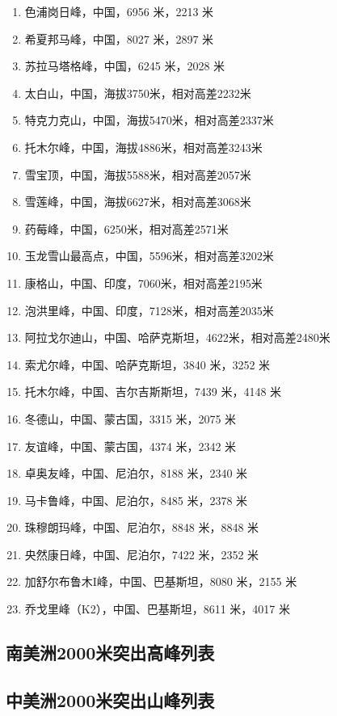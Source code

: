 \documentclass[10pt,twocolumn,letterpaper]{article}
\begin{document}
\begin{flushleft}
\begin{enumerate}
    \item 色浦岗日峰，中国，6956 米，2213 米
    \item 希夏邦马峰，中国，8027 米，2897 米
    \item 苏拉马塔格峰，中国，6245 米，2028 米
    \item 太白山，中国，海拔3750米，相对高差2232米
    \item 特克力克山，中国，海拔5470米，相对高差2337米
    \item 托木尔峰，中国，海拔4886米，相对高差3243米
    \item 雪宝顶，中国，海拔5588米，相对高差2057米
    \item 雪莲峰，中国，海拔6627米，相对高差3068米
    \item 药莓峰，中国，6250米，相对高差2571米
    \item 玉龙雪山最高点，中国，5596米，相对高差3202米
    \item 康格山，中国、印度，7060米，相对高差2195米
    \item 泡洪里峰，中国、印度，7128米，相对高差2035米
    \item 阿拉戈尔迪山，中国、哈萨克斯坦，4622米，相对高差2480米
    \item 索尤尔峰，中国、哈萨克斯坦，3840 米，3252 米
    \item 托木尔峰，中国、吉尔吉斯斯坦，7439 米，4148 米
    \item 冬德山，中国、蒙古国，3315 米，2075 米
    \item 友谊峰，中国、蒙古国，4374 米，2342 米
    \item 卓奥友峰，中国、尼泊尔，8188 米，2340 米
    \item 马卡鲁峰，中国、尼泊尔，8485 米，2378 米
    \item 珠穆朗玛峰，中国、尼泊尔，8848 米，8848 米
    \item 央然康日峰，中国、尼泊尔，7422 米，2352 米
    \item 加舒尔布鲁木I峰，中国、巴基斯坦，8080 米，2155 米
    \item 乔戈里峰（K2），中国、巴基斯坦，8611 米，4017 米
\end{enumerate}
\end{flushleft}

\subsection{南美洲2000米突出高峰列表}
\subsection{中美洲2000米突出山峰列表}
\end{document}
